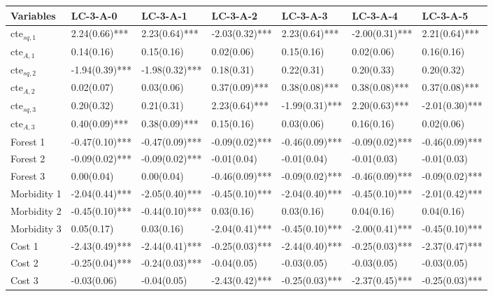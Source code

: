 \begin{tabular}{lllllll}
  \hline
Variables & LC-3-A-0 & LC-3-A-1 & LC-3-A-2 & LC-3-A-3 & LC-3-A-4 & LC-3-A-5 \\ 
  \hline
cte$_{sq,1}$ &  2.24(0.66)*** &  2.23(0.64)*** & -2.03(0.32)*** &  2.23(0.64)*** & -2.00(0.31)*** &  2.21(0.64)*** \\ 
  cte$_{A ,1}$ &  0.14(0.16)    &  0.15(0.16)    &  0.02(0.06)    &  0.15(0.16)    &  0.02(0.06)    &  0.16(0.16)    \\ 
  cte$_{sq,2}$ & -1.94(0.39)*** & -1.98(0.32)*** &  0.18(0.31)    &  0.22(0.31)    &  0.20(0.33)    &  0.20(0.32)    \\ 
  cte$_{A ,2}$ &  0.02(0.07)    &  0.03(0.06)    &  0.37(0.09)*** &  0.38(0.08)*** &  0.38(0.08)*** &  0.37(0.08)*** \\ 
  cte$_{sq,3}$ &  0.20(0.32)    &  0.21(0.31)    &  2.23(0.64)*** & -1.99(0.31)*** &  2.20(0.63)*** & -2.01(0.30)*** \\ 
  cte$_{A ,3}$ &  0.40(0.09)*** &  0.38(0.09)*** &  0.15(0.16)    &  0.03(0.06)    &  0.16(0.16)    &  0.02(0.06)    \\ 
  Forest 1 & -0.47(0.10)*** & -0.47(0.09)*** & -0.09(0.02)*** & -0.46(0.09)*** & -0.09(0.02)*** & -0.46(0.09)*** \\ 
  Forest 2 & -0.09(0.02)*** & -0.09(0.02)*** & -0.01(0.04)    & -0.01(0.04)    & -0.01(0.03)    & -0.01(0.03)    \\ 
  Forest 3 &  0.00(0.04)    &  0.00(0.04)    & -0.46(0.09)*** & -0.09(0.02)*** & -0.46(0.09)*** & -0.09(0.02)*** \\ 
  Morbidity 1 & -2.04(0.44)*** & -2.05(0.40)*** & -0.45(0.10)*** & -2.04(0.40)*** & -0.45(0.10)*** & -2.01(0.42)*** \\ 
  Morbidity 2 & -0.45(0.10)*** & -0.44(0.10)*** &  0.03(0.16)    &  0.03(0.16)    &  0.04(0.16)    &  0.04(0.16)    \\ 
  Morbidity 3 &  0.05(0.17)    &  0.03(0.16)    & -2.04(0.41)*** & -0.45(0.10)*** & -2.00(0.41)*** & -0.45(0.10)*** \\ 
  Cost 1 & -2.43(0.49)*** & -2.44(0.41)*** & -0.25(0.03)*** & -2.44(0.40)*** & -0.25(0.03)*** & -2.37(0.47)*** \\ 
  Cost 2 & -0.25(0.04)*** & -0.24(0.03)*** & -0.04(0.05)    & -0.03(0.05)    & -0.03(0.05)    & -0.03(0.05)    \\ 
  Cost 3 & -0.03(0.06)    & -0.04(0.05)    & -2.43(0.42)*** & -0.25(0.03)*** & -2.37(0.45)*** & -0.25(0.03)*** \\ 

\end{tabular}

